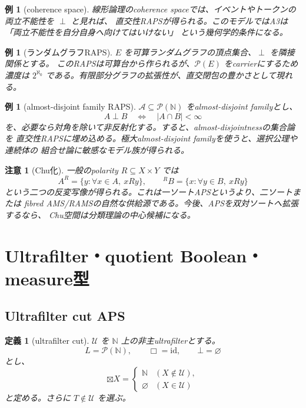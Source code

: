 \documentclass[uplatex,dvipdfmx,a4paper,10pt]{jsarticle}
\newtheorem{definition}[theorem]{定義}
\newtheorem{example}[theorem]{例}
\newtheorem{remark}[theorem]{注意}
\newcommand{\bt}{\boxtimes}
\newcommand{\Pow}{\mathcal P}
\newcommand{\calU}{\mathcal U}
\newcommand{\N}{\mathbb N}
\begin{document}
\begin{example}[coherence space]
線形論理のcoherence spaceでは、イベントやトークンの両立不能性を \(\perp\) と見れば、
直交性RAPSが得られる。このモデルではA3は「両立不能性を自分自身へ向けてはいけない」
という幾何学的条件になる。
\end{example}

\begin{example}[ランダムグラフRAPS]
\(E\) を可算ランダムグラフの頂点集合、\(\perp\) を隣接関係とする。
このRAPSは可算台から作られるが、\(\Pow(E)\) をcarrierにするため濃度は
\(2^{\aleph_0}\) である。有限部分グラフの拡張性が、直交閉包の豊かさとして現れる。
\end{example}

\begin{example}[almost-disjoint family RAPS]
\(\mathcal A\subseteq\Pow(\N)\) をalmost-disjoint familyとし、
\[
A\perp B\quad\Longleftrightarrow\quad |A\cap B|<\infty
\]
を、必要なら対角を除いて非反射化する。すると、almost-disjointnessの集合論を
直交性RAPSに埋め込める。極大almost-disjoint familyを使うと、選択公理や連続体の
組合せ論に敏感なモデル族が得られる。
\end{example}

\begin{remark}[Chu化]
一般のpolarity \(R\subseteq X\times Y\) では
\[
A^R=\{y:\forall x\in A,\ xRy\},\qquad
{}^RB=\{x:\forall y\in B,\ xRy\}
\]
という二つの反変写像が得られる。これは一ソートAPSというより、二ソートまたは
fibred AMS/RAMSの自然な供給源である。今後、APSを双対ソートへ拡張するなら、
Chu空間は分類理論の中心候補になる。
\end{remark}

\section{Ultrafilter・quotient Boolean・measure型}

\subsection{Ultrafilter cut APS}

\begin{definition}[ultrafilter cut]
\(\calU\) を \(\N\) 上の非主ultrafilterとする。
\[
L=\Pow(\N),\qquad \Box=\mathrm{id},\qquad \bot=\varnothing
\]
とし、
\[
\bt X=
\begin{cases}
\N & (X\notin\calU),\\
\varnothing & (X\in\calU)
\end{cases}
\]
と定める。さらに \(T\notin\calU\) を選ぶ。
\end{definition}
\end{document}
